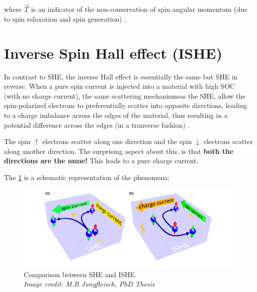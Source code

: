 where $ \vec{T} $ is an indicator of the non-conservation of spin angular momentum (due to spin relaxation and spin generation) \cite{Uchida_2016}.

\section{Inverse Spin Hall effect (ISHE)}

In contrast to SHE, the inverse Hall effect is essentially the same but SHE in reverse. When a pure spin current is injected into a material with high SOC (with no charge current), the same scattering mechanisms\footnotemark[\value{footnote}] as the SHE, allow the spin-polarized electrons to preferentially scatter into opposite directions, leading to a charge imbalance across the edges of the material, thus resulting in a potential difference across the edges (in a tranverse fashion) \cite{d1971possibility}.

The spin $\uparrow$ electrons scatter along one direction and the spin $\downarrow$ electrons scatter along another direction. The surprising aspect about this, is that \textbf{both the directions are the same!}
This leads to a pure charge current.

The \cref{she-vs-ishe} is a schematic representation of the phenomena:

\begin{figure}[h!]
    \includegraphics[width=\columnwidth]{ishe.png}
    \caption{Comparison between SHE and ISHE.\\ \vspace{0.2cm}\textit{Image credit: M.B Jungfleisch, PhD Thesis}}
    \label{she-vs-ishe}
\end{figure}

